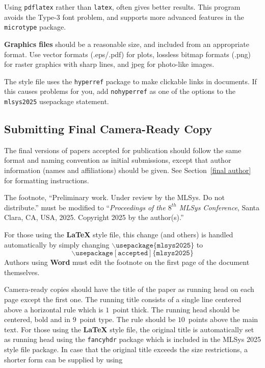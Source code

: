 \documentclass{article}
\begin{document}
Using \texttt{pdflatex} rather than \texttt{latex}, often gives better
results. This program avoids the Type-3 font problem, and supports more
advanced features in the \texttt{microtype} package.

\textbf{Graphics files} should be a reasonable size, and included from
an appropriate format. Use vector formats (.eps/.pdf) for plots,
lossless bitmap formats (.png) for raster graphics with sharp lines, and
jpeg for photo-like images.

The style file uses the \texttt{hyperref} package to make clickable
links in documents. If this causes problems for you, add
\texttt{nohyperref} as one of the options to the \texttt{mlsys2025}
usepackage statement.


\subsection{Submitting Final Camera-Ready Copy}

The final versions of papers accepted for publication should follow the
same format and naming convention as initial submissions, except that
author information (names and affiliations) should be given. See
Section~\ref{final author} for formatting instructions.

The footnote, ``Preliminary work. Under review by the MLSys. Do not distribute.'' 
must be modified to ``\textit{Proceedings of the
$\mathit{8}^{th}$ MLSys Conference},
Santa Clara, CA, USA, 2025.
Copyright 2025 by the author(s).''

For those using the \textbf{\LaTeX} style file, this change (and others) is
handled automatically by simply changing
$\mathtt{\backslash usepackage\{mlsys2025\}}$ to
$$\mathtt{\backslash usepackage[accepted]\{mlsys2025\}}$$
Authors using \textbf{Word} must edit the
footnote on the first page of the document themselves.

Camera-ready copies should have the title of the paper as running head
on each page except the first one. The running title consists of a
single line centered above a horizontal rule which is $1$~point thick.
The running head should be centered, bold and in $9$~point type. The
rule should be $10$~points above the main text. For those using the
\textbf{\LaTeX} style file, the original title is automatically set as running
head using the \texttt{fancyhdr} package which is included in the MLSys
2025 style file package. In case that the original title exceeds the
size restrictions, a shorter form can be supplied by using
\end{document}

